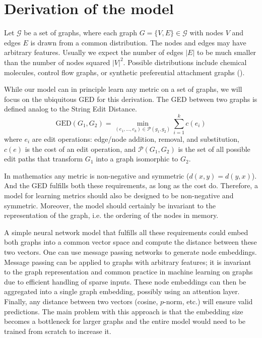 \section{Derivation of the model}

Let $\mathcal{G}$ be a set of graphs, where each graph $G = \{V, E\} \in \mathcal{G}$ with nodes $V$ and edges $E$ is drawn from a common distribution. The nodes and edges may have arbitrary features. Usually we expect the number of edges $\vert E \vert$ to be much smaller than the number of nodes squared $\vert V \vert ^2$. Possible distributions include chemical molecules, control flow graphs, or synthetic preferential attachment graphs (\citealp{pref_att2002}).

While our model can in principle learn any metric on a set of graphs, we will focus on the ubiquitous GED for this derivation. The GED between two graphs is defined analog to the String Edit Distance.
\begin{equation}
     \text{GED}(G_{1},G_{2}) = \min_{(e_{1},...,e_{k}) \in \mathcal{P}(g_{1},g_{2})} \sum_{i=1}^{k} c(e_{i})
\end{equation}
where $e_{i}$ are edit operations: edge/node addition, removal, and substitution, $c(e)$ is the cost of an edit operation, and $\mathcal{P}(G_{1},G_{2})$ is the set of all possible edit paths that transform $G_{1}$ into a graph isomorphic to $G_{2}$.

In mathematics any metric is non-negative and symmetric ($d(x,y) = d(y,x)$). And the GED fulfills both these requirements, as long as the cost do. Therefore, a model for learning metrics should also be designed to be non-negative and symmetric. Moreover, the model should certainly be invariant to the representation of the graph, i.e. the ordering of the nodes in memory.

A simple neural network model that fulfills all these requirements could embed both graphs into a common vector space and compute the distance between these two vectors. One can use message passing networks to generate node embeddings. Message passing can be applied to graphs with arbitrary features; it is invariant to the graph representation and common practice in machine learning on graphs due to efficient handling of sparse inputs. These node embeddings can then be aggregated into a single graph embedding, possibly using an attention layer. Finally, any distance between two vectors (cosine, $p$-norm, etc.) will ensure valid predictions. The main problem with this approach is that the embedding size becomes a bottleneck for larger graphs and the entire model would need to be trained from scratch to increase it.

